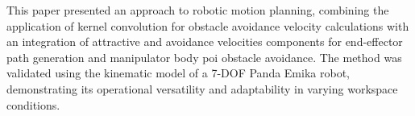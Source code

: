 \documentclass[a4paper]{article}
\begin{document}
%
%
%
%
%

This paper presented an approach to robotic motion planning, combining the application of kernel convolution for obstacle avoidance velocity calculations with an integration of attractive and avoidance velocities components for end-effector path generation and manipulator body poi obstacle avoidance. The method was validated using the kinematic model of a 7-DOF Panda Emika robot, demonstrating its operational versatility and adaptability in varying workspace conditions.
\end{document}
